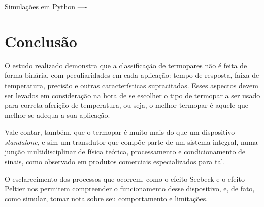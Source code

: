 \documentclass[a4paper,12pt]{report}
\begin{document}
	Simulações em Python ----
	

	\section{Conclusão}
	O estudo realizado demonstra que a classificação de termopares não é feita de forma binária, com peculiaridades em cada aplicação: tempo de resposta, faixa de temperatura, precisão e outras características supracitadas. Esses aspectos devem ser levados em consideração na hora de se escolher o tipo de termopar a ser usado para correta aferição de temperatura, ou seja, o melhor termopar é aquele que melhor se adequa a sua aplicação. 
	
	Vale contar, também, que o termopar é muito mais do que um dispositivo \textit{standalone}, e sim um transdutor que compõe parte de um sistema integral, numa junção multidisciplinar de física teórica, processamento e condicionamento de sinais, como observado em produtos comerciais especializados para tal.
	
	O esclarecimento dos processos que ocorrem, como o efeito Seebeck e o efeito Peltier nos permitem compreender o funcionamento desse dispositivo, e, de fato, como simular, tomar nota sobre seu comportamento e limitações.
	
	\nocite{*}
	

	
	
	
\end{document}

